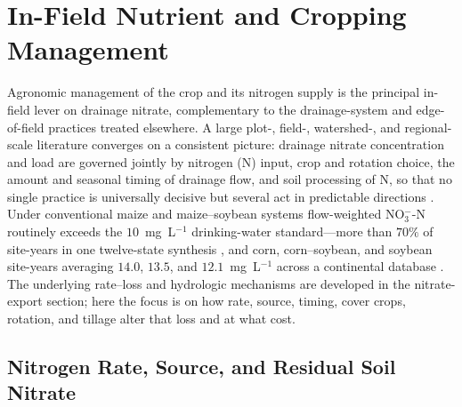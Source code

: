 \documentclass[11pt]{article}
\begin{document}
\section*{In-Field Nutrient and Cropping Management}

Agronomic management of the crop and its nitrogen supply is the principal
in-field lever on drainage nitrate, complementary to the drainage-system and
edge-of-field practices treated elsewhere. A large plot-, field-,
watershed-, and regional-scale literature converges on a consistent picture:
drainage nitrate concentration and load are governed jointly by nitrogen (N)
input, crop and rotation choice, the amount and seasonal timing of drainage
flow, and soil processing of N, so that no single practice is universally
decisive but several act in predictable directions
\parencite{Dinnes2002}. Under conventional maize and maize--soybean systems
flow-weighted NO$_3^-$-N routinely exceeds the $10$~mg~L$^{-1}$
drinking-water standard---more than $70\%$ of site-years in one twelve-state
synthesis \parencite{Liu2021}, and corn, corn--soybean, and soybean
site-years averaging $14.0$, $13.5$, and $12.1$~mg~L$^{-1}$ across a
continental database \parencite{Hertzberger2019}. The underlying rate--loss
and hydrologic mechanisms are developed in the nitrate-export section; here
the focus is on how rate, source, timing, cover crops, rotation, and tillage
alter that loss and at what cost.

\subsection{Nitrogen Rate, Source, and Residual Soil Nitrate}
\end{document}
